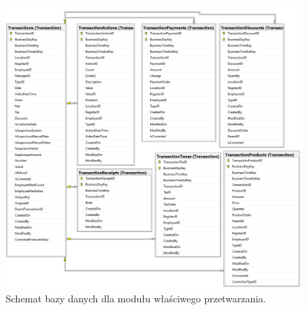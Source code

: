 \documentclass[a4paper]{book}
\begin{document}
\begin{figure}[t]
	\centering
	\includegraphics[width=\textwidth]{./img/parser_database_schema.png}
	\caption{Schemat bazy danych dla modułu właściwego przetwarzania.}
	\label{fig:parser_database_schema}
\end{figure} 
\end{document}
